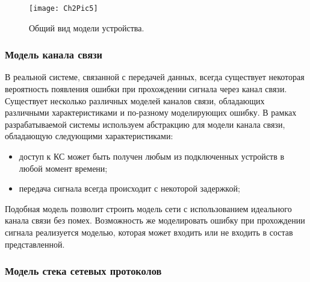     \begin{figure}\center
        \texttt{[image: Ch2Pic5]}
        \caption{Общий вид модели устройства.} \label{Pic5}
    \end{figure}

    \subsubsection{Модель канала связи}

    В реальной системе, связанной с передачей данных, всегда существует некоторая вероятность появления ошибки при прохождении сигнала через канал связи. Существует несколько различных моделей каналов связи, обладающих различными характеристиками и по-разному моделирующих ошибку. В рамках разрабатываемой системы используем абстракцию для модели канала связи, обладающую следующими характеристиками:

    \begin{itemize}
        \item доступ к КС может быть получен любым из подключенных устройств в любой момент времени;
        \item передача сигнала всегда происходит с некоторой задержкой;
    \end{itemize}

    Подобная модель позволит строить модель сети с использованием идеального канала связи без помех. Возможность же моделировать ошибку при прохождении сигнала реализуется моделью, которая может входить или не входить в состав представленной.

    \subsubsection{Модель стека сетевых протоколов}


